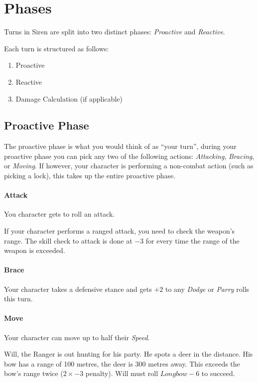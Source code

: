 \section{Phases}\label{sec:phases}
Turns in Siren are split into two distinct phases: \textit{Proactive} and \textit{Reactive}.

Each turn is structured as follows:
\begin{enumerate}
  \item Proactive 
  \item Reactive
  \item Damage Calculation (if applicable)
\end{enumerate}

\subsection{Proactive Phase}
The proactive phase is what you would think of as ``your turn'', during your proactive phase you can pick any two of the following actions: \textit{Attacking}, \textit{Bracing}, or \textit{Moving}.
If however, your character is performing a non-combat action (such as picking a lock), this takes up the entire proactive phase.

\paragraph{Attack}
You character gets to roll an attack.

If your character performs a ranged attack, you need to check the weapon's range.
The skill check to attack is done at $-3$ for every time the range of the weapon is exceeded.

\paragraph{Brace}
Your character takes a defensive stance and gets $+2$ to any \textit{Dodge} or \textit{Parry} rolls this turn.

\paragraph{Move}
Your character can move up to half their \textit{Speed}.

\begin{tcolorbox}[title = Ranged Attack Example] 
  Will, the Ranger is out hunting for his party. 
  He spots a deer in the distance. 
  His bow has a range of 100 metres, the deer is 300 metres away. 
  This exceeds the bow's range twice ($2\times -3$ penalty). 
  Will must roll $Longbow-6$ to succeed.
\end{tcolorbox}

